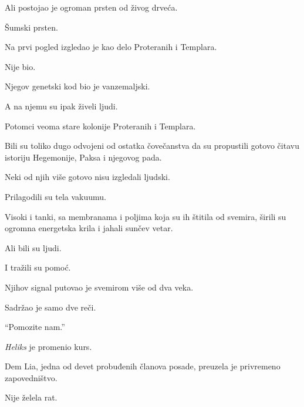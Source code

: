 \bigskip

Ali postojao je ogroman prsten od živog drveća.

\bigskip

Šumski prsten.

\bigskip

Na prvi pogled izgledao je kao delo Proteranih i Templara.

\bigskip

Nije bio.

\bigskip

Njegov genetski kod bio je vanzemaljski.

\bigskip

A na njemu su ipak živeli ljudi.

\bigskip

Potomci veoma stare kolonije Proteranih i Templara.

\bigskip

Bili su toliko dugo odvojeni od ostatka čovečanstva da su propustili gotovo čitavu istoriju Hegemonije, Paksa i njegovog pada.

\bigskip

Neki od njih više gotovo nisu izgledali ljudski.

\bigskip

Prilagodili su tela vakuumu.

\bigskip

Visoki i tanki, sa membranama i poljima koja su ih štitila od svemira, širili su ogromna energetska krila i jahali sunčev vetar.

\bigskip

Ali bili su ljudi.

\bigskip

I tražili su pomoć.

\bigskip

Njihov signal putovao je svemirom više od dva veka.

\bigskip

Sadržao je samo dve reči.

\bigskip

``Pomozite nam.''

\bigskip

\emph{Heliks} je promenio kurs.

\bigskip

Dem Lia, jedna od devet probuđenih članova posade, preuzela je privremeno zapovedništvo.

\bigskip

Nije želela rat.

\bigskip

